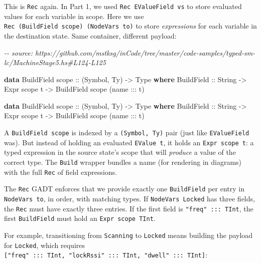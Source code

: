 \documentclass[]{article}
\newenvironment{Shaded}{}{}
\newcommand{\CommentTok}[1]{\textcolor[rgb]{0.38,0.63,0.69}{\textit{#1}}}
\newcommand{\DataTypeTok}[1]{\textcolor[rgb]{0.56,0.13,0.00}{#1}}
\newcommand{\KeywordTok}[1]{\textcolor[rgb]{0.00,0.44,0.13}{\textbf{#1}}}
\newcommand{\NormalTok}[1]{#1}
\newcommand{\OperatorTok}[1]{\textcolor[rgb]{0.40,0.40,0.40}{#1}}
\newcommand{\OtherTok}[1]{\textcolor[rgb]{0.00,0.44,0.13}{#1}}
\begin{document}
This is \texttt{Rec} again. In Part 1, we used \texttt{Rec\ EValueField\ vs} to
store evaluated values for each variable in scope. Here we use
\texttt{Rec\ (BuildField\ scope)\ (NodeVars\ to)} to store \emph{expressions}
for each variable in the destination state. Same container, different payload:

\begin{Shaded}
\begin{Highlighting}[]
\CommentTok{{-}{-} source: https://github.com/mstksg/inCode/tree/master/code{-}samples/typed{-}sm{-}lc/MachineStage5.hs\#L124{-}L125}

\KeywordTok{data} \DataTypeTok{BuildField}\OtherTok{ scope ::}\NormalTok{ (}\DataTypeTok{Symbol}\NormalTok{, }\DataTypeTok{Ty}\NormalTok{) }\OtherTok{{-}\textgreater{}} \DataTypeTok{Type} \KeywordTok{where}
  \DataTypeTok{BuildField}\OtherTok{ ::} \DataTypeTok{String} \OtherTok{{-}\textgreater{}} \DataTypeTok{Expr}\NormalTok{ scope t }\OtherTok{{-}\textgreater{}} \DataTypeTok{BuildField}\NormalTok{ scope (name }\OperatorTok{:::}\NormalTok{ t)}

\KeywordTok{data} \DataTypeTok{BuildField}\OtherTok{ scope ::}\NormalTok{ (}\DataTypeTok{Symbol}\NormalTok{, }\DataTypeTok{Ty}\NormalTok{) }\OtherTok{{-}\textgreater{}} \DataTypeTok{Type} \KeywordTok{where}
  \DataTypeTok{BuildField}\OtherTok{ ::} \DataTypeTok{String} \OtherTok{{-}\textgreater{}} \DataTypeTok{Expr}\NormalTok{ scope t }\OtherTok{{-}\textgreater{}} \DataTypeTok{BuildField}\NormalTok{ scope (name }\OperatorTok{:::}\NormalTok{ t)}
\end{Highlighting}
\end{Shaded}

A \texttt{BuildField\ scope} is indexed by a \texttt{(Symbol,\ Ty)} pair (just
like \texttt{EValueField} was). But instead of holding an evaluated
\texttt{EValue\ t}, it holds an \texttt{Expr\ scope\ t}: a typed expression in
the source state's scope that will \emph{produce} a value of the correct type.
The \texttt{Build} wrapper bundles a name (for rendering in diagrams) with the
full \texttt{Rec} of field expressions.

The \texttt{Rec} GADT enforces that we provide exactly one \texttt{BuildField}
per entry in \texttt{NodeVars\ to}, in order, with matching types. If
\texttt{NodeVars\ Locked} has three fields, the \texttt{Rec} must have exactly
three entries. If the first field is \texttt{"freq"\ :::\ TInt}, the first
\texttt{BuildField} must hold an \texttt{Expr\ scope\ TInt}.

For example, transitioning from \texttt{Scanning} to \texttt{Locked} means
building the payload for \texttt{Locked}, which requires
\texttt{{[}"freq"\ :::\ TInt,\ "lockRssi"\ :::\ TInt,\ "dwell"\ :::\ TInt{]}}:
\end{document}
